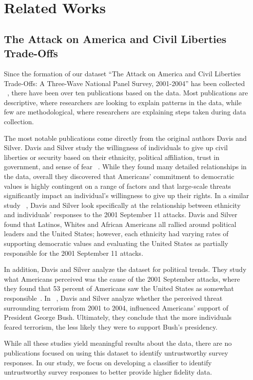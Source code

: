 \section{Related Works}
\subsection{The Attack on America and Civil Liberties Trade-Offs}
Since the formation of our dataset “The Attack on America and Civil Liberties Trade-Offs: A Three-Wave National Panel Survey, 2001-2004” has been collected ~\cite{data}, there have been over ten publications based on the data. Most publications are descriptive, where researchers are looking to explain patterns in the data, while few are methodological, where researchers are explaining steps taken during data collection. 

The most notable publications come directly from the original authors Davis and Silver. Davis and Silver study the willingness of individuals to give up civil liberties or security based on their ethnicity, political affiliation, trust in government, and sense of fear ~\cite{Davis_Silver_2004_1}. While they found many detailed relationships in the data, overall they discovered that Americans’ commitment to democratic values is highly contingent on a range of factors and that large-scale threats significantly impact an individual’s willingness to give up their rights. In a similar study ~\cite{Davis_2004_2}, Davis and Silver look specifically at the relationship between ethnicity and individuals’ responses to the 2001 September 11 attacks. Davis and Silver found that Latinos, Whites and African Americans all rallied around political leaders and the United States; however, each ethnicity had varying rates of supporting democratic values and evaluating the United States as partially responsible for the 2001 September 11 attacks. 

In addition, Davis and Silver analyze the dataset for political trends. They study what Americans perceived was the cause of the 2001 September attacks, where they found that 53 percent of Americans saw the United States as somewhat responsible~\cite{Davis_Silver_2004_3}. In ~\cite{Davis_Silver_2004_4}, Davis and Silver analyze whether the perceived threat surrounding terrorism from 2001 to 2004, influenced Americans' support of President George Bush. Ultimately, they conclude that the more individuals feared terrorism, the less likely they were to support Bush’s presidency.

While all these studies yield meaningful results about the data, there are no publications focused on using this dataset to identify untrustworthy survey responses. In our study, we focus on developing a classifier to identify untrustworthy survey responses to better provide higher fidelity data.

